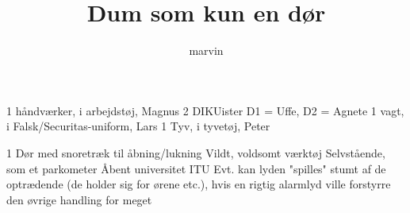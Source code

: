 \documentclass[danish]{article}
\title{Dum som kun en dør}
\author{marvin}
\begin{document}
\maketitle

\begin{roles}
   1 håndværker, i arbejdstøj, Magnus
   2 DIKUister D1 = Uffe, D2 = Agnete
   1 vagt, i Falsk/Securitas-uniform, Lars
   1 Tyv, i tyvetøj, Peter
\end{roles}

\begin{props}
   1 Dør med snoretræk til åbning/lukning
   Vildt, voldsomt værktøj
   Selvstående, som et parkometer
   Åbent universitet
   ITU
   Evt. kan lyden "spilles" stumt af de optrædende (de holder sig
  for ørene etc.), hvis en rigtig alarmlyd ville forstyrre den øvrige handling
  for meget
\end{props}
\end{document}
